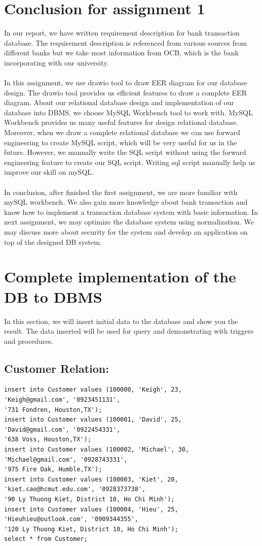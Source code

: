 \documentclass[12pt,a4paper]{article}
\begin{document}
\section{Conclusion for assignment 1}
\indent In our report, we have written requirement description for bank transaction database. The requirement description is referenced from various sources from different banks but we take most information from OCB, which is the bank incorporating with our university.\\\\
\indent In this assignment, we use drawio tool to draw EER diagram for our database design. The drawio tool provides us efficient features to draw a complete EER diagram. About our relational database design and implementation of our database into DBMS, we choose MySQL Workbench tool to work with. MySQL Workbench provides us many useful features for design relational database. Moreover, when we draw a complete relational database we can use forward engineering to create MySQL script, which will be very useful for us in the future. However, we manually write the SQL script without using the forward engineering feature to create our SQL script. Writing sql script manually help us improve our skill on mySQL.\\\\
\indent In conclusion, after finished the first assignment, we are more familiar with mySQL workbench. We also gain more knowledge about bank transaction and know how to implement a transaction database system with basic information. In next assignment, we may optimize the database system using normalization. We may discuss more about security for the system and develop an application on top of the designed DB system.

\newpage
\section{Complete implementation of the DB to DBMS}
In this section, we will insert initial data to the database and show you the result. The data inserted will be used for query and demonstrating with triggers and procedures.

\subsection{Customer Relation:}
\begin{verbatim}
insert into Customer values (100000, 'Keigh', 23,
'Keigh@gmail.com', '0923451131', 
'731 Fondren, Houston,TX');
insert into Customer values (100001, 'David', 25,
'David@gmail.com', '0922454331', 
'638 Voss, Houston,TX');
insert into Customer values (100002, 'Michael', 30,
'Michael@gmail.com', '0928743331', 
'975 Fire Oak, Humble,TX');
insert into Customer values (100003, 'Kiet', 20, 
'kiet.cao@hcmut.edu.com', '0928373738', 
'90 Ly Thuong Kiet, District 10, Ho Chi Minh');
insert into Customer values (100004, 'Hieu', 25, 
'Hieuhieu@outlook.com', '0909344355', 
'120 Ly Thuong Kiet, District 10, Ho Chi Minh');
select * from Customer;
\end{verbatim}
\end{document}
